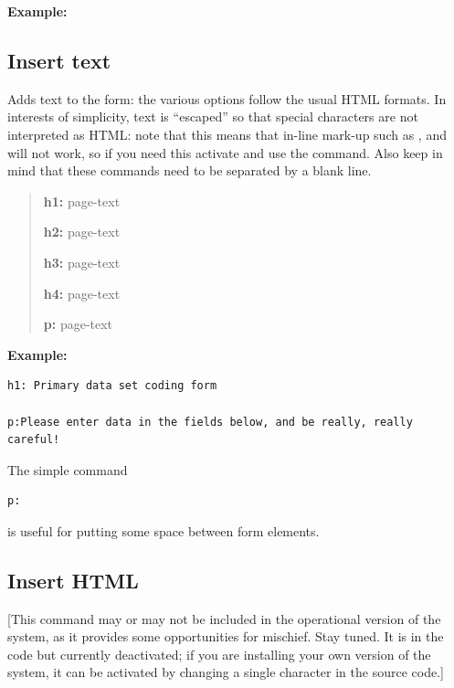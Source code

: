 \documentclass[letterpaper,10pt,english]{sphinxmanual}
\begin{document}
\textbf{Example:}
\begin{quote}

\end{quote}


\subsection{Insert text}
\label{forms:insert-text}
Adds text to the form: the various options follow the usual HTML
formats. In interests of simplicity, text is “escaped” so that special
characters are not interpreted as HTML: note that this means that
in-line mark-up such as ,  and  will not work,
so if you need this activate and use the  command. Also keep in
mind that these commands need to be separated by a blank line.
\begin{quote}

\begin{DUlineblock}{0em}
\item[] \textbf{h1:} page-text
\item[] \textbf{h2:} page-text
\item[] \textbf{h3:} page-text
\item[] \textbf{h4:} page-text
\item[] \textbf{p:} page-text
\end{DUlineblock}
\end{quote}

\textbf{Example:}

\begin{Verbatim}[commandchars=\\\{\}]
h1: Primary data set coding form

p:Please enter data in the fields below, and be really, really careful!
\end{Verbatim}

The simple command

\begin{Verbatim}[commandchars=\\\{\}]
p:
\end{Verbatim}

is useful for putting some space between form elements.


\subsection{Insert HTML}
\label{forms:insert-html}
{[}This command may or may not be included in the operational version of
the system, as it provides some opportunities for mischief. Stay tuned.
It is in the code but currently deactivated; if you are installing your
own version of the system, it can be activated by changing a single
character in the source code.{]}
\end{document}
